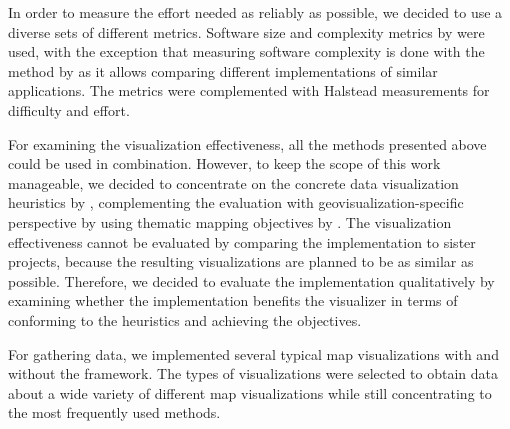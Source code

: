 In order to measure the effort needed as reliably as possible, we decided to use a diverse sets of different metrics. Software size and complexity metrics by \citet{fenton_software_1998} were used, with the exception that measuring software complexity is done with the method by \citet{mccabe_complexity_1976} as it allows comparing different implementations of similar applications. The metrics were complemented with Halstead measurements for difficulty and effort.

For examining the visualization effectiveness, all the methods presented above could be used in combination. However, to keep the scope of this work manageable, we decided to concentrate on the concrete data visualization heuristics by \citet{zuk_heuristics_2006}, complementing the evaluation with geovisualization-specific perspective by using thematic mapping objectives by \citet{schlichtmann_visualization_2002}. The visualization effectiveness cannot be evaluated by comparing the implementation to sister projects, because the resulting visualizations are planned to be as similar as possible. Therefore, we decided to evaluate the implementation qualitatively by examining whether the implementation benefits the visualizer in terms of conforming to the heuristics and achieving the objectives.

For gathering data, we implemented several typical map visualizations with and without the framework. The types of visualizations were selected to obtain data about a wide variety of different map visualizations while still concentrating to the most frequently used methods.

